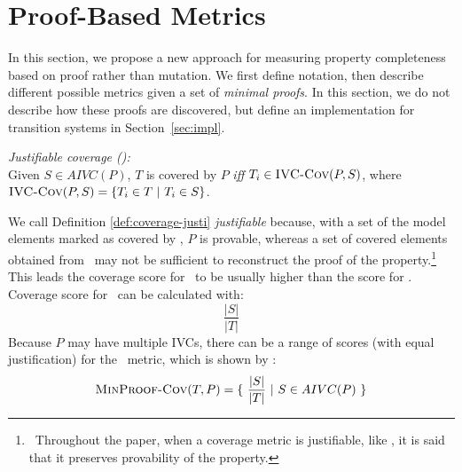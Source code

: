 \newcommand{\minproofcov}{\text{\sc MinProof-Cov}}


\section{Proof-Based Metrics}
\label{sec:method}

In this section, we propose a new approach for measuring property completeness based on proof rather than mutation.  We first define notation, then describe different possible metrics given a set of {\em minimal proofs}.  In this section, we do not describe how these proofs are discovered, but define an implementation for transition systems in Section~\ref{sec:impl}.

\begin{definition} {\emph{Justifiable coverage (\ivccov):}} \\
\label{def:coverage-justi}
Given $S \in AIVC(P)$, $T$ is covered by $P$ \emph{iff} \allowbreak $T_i \in \text{\sc IVC-Cov} (P, S)$, where
\allowbreak $\text{\sc IVC-Cov} (P, S) = \{ T_i \in T ~|~ T_i \in S \}$.
\end{definition}
\vspace{2mm}

%
We call Definition \ref{def:coverage-justi} \emph{justifiable} because, with a set of the model elements marked as covered by \ivccov, $P$ is provable, whereas a set of covered elements obtained from \nondetcov\ may not be sufficient to reconstruct the proof of the property.\footnote{\noindent ~Throughout the paper, when a coverage metric is justifiable, like \ivccov, it is said that it preserves provability of the property.}
This leads the coverage score for \ivccov\ to be usually higher than the score for \nondetcov. Coverage score for \ivccov\ can be calculated with: $$\frac{|S|}{|T|}$$
Because $P$ may have multiple IVCs, there can be a range of scores (with equal justification) for the \ivccov\ metric, which is shown by \minproofcov:
\[
   \minproofcov(T, P) = \{~\frac{ |S|}{|T|}~|~S \in AIVC(P)~\}
\]

